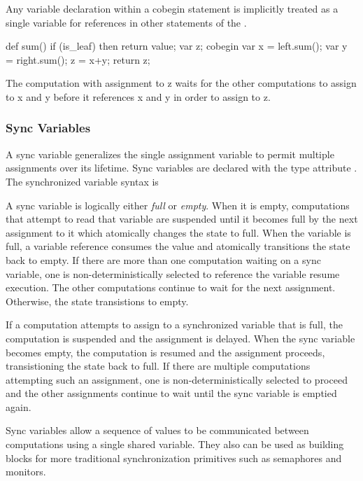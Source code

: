 Any variable declaration within a cobegin statement is implicitly treated as
a single variable for references in other statements of the
.  
\begin{example}
\begin{chapel}
def sum() {
  if (is_leaf) then 
    return value;
  var z;
  cobegin {
    var x = left.sum();
    var y = right.sum();
    z = x+y;
  }
  return z;
}
\end{chapel}
The computation with assignment to z waits for the other computations 
to assign to x and y before it references x and y in order to assign to z.
\end{example}


\subsubsection{Sync Variables}
\label{Sync_Variables}

A sync variable generalizes the single assignment variable to
permit multiple assignments over its lifetime. Sync variables
are declared with the type attribute . The synchronized
variable syntax is
\begin{chapel}
\end{chapel}
A sync variable is logically either {\em full} or {\em empty}. When it
is empty, computations that attempt to read that variable are
suspended until it becomes full by the next assignment to it which
atomically changes the state to full. When the variable is full, a
variable reference consumes the value and atomically transitions the
state back to empty. If there are more than one computation waiting on
a sync variable, one is non-deterministically selected to reference the
variable resume execution.  The other computations continue to wait for
the next assignment. Otherwise, the state transistions to empty.

If a computation attempts to assign to a synchronized variable that is
full, the computation is suspended and the assignment is delayed. When
the sync variable becomes empty, the computation is resumed and the
assignment proceeds, transistioning the state back to full. If there
are multiple computations attempting such an assignment, one is
non-deterministically selected to proceed and the other assignments
continue to wait until the sync variable is emptied again.

Sync variables allow a sequence of values to be communicated
between computations using a single shared variable. They also can be
used as building blocks for more traditional synchronization
primitives such as semaphores and monitors.

